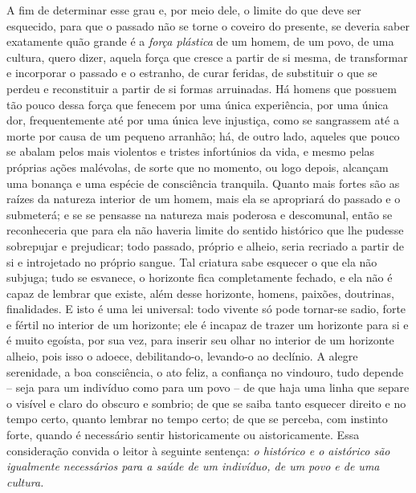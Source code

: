 A fim de determinar esse grau e, por meio dele, o limite do que
deve ser esquecido, para que o passado não se torne o coveiro do
presente, se deveria saber exatamente quão grande é a \emph{força
plástica} de um homem, de um povo, de uma cultura, quero dizer, aquela
força que cresce a partir de si mesma, de transformar e incorporar o
passado e o estranho, de curar feridas, de substituir o que se perdeu e
reconstituir a partir de si formas arruinadas. Há homens que possuem tão
pouco dessa força que fenecem por uma única experiência, por uma única
dor, frequentemente até por uma única leve injustiça, como se sangrassem
até a morte por causa de um pequeno arranhão; há, de outro lado, aqueles
que pouco se abalam pelos mais violentos e tristes infortúnios da vida,
e mesmo pelas próprias ações malévolas, de sorte que no momento, ou logo
depois, alcançam uma bonança e uma espécie de consciência tranquila.
Quanto mais fortes são as raízes da natureza interior de um homem, mais
ela se apropriará do passado e o submeterá; e se se pensasse na natureza
mais poderosa e descomunal, então se reconheceria que para ela não
haveria limite do sentido histórico que lhe pudesse sobrepujar e
prejudicar; todo passado, próprio e alheio, seria recriado a partir de
si e introjetado no próprio sangue. Tal criatura sabe esquecer o que ela
não subjuga; tudo se esvanece, o horizonte fica completamente fechado, e
ela não é capaz de lembrar que existe, além desse horizonte, homens,
paixões, doutrinas, finalidades. E isto é uma lei universal: todo
vivente só pode tornar-se sadio, forte e fértil no interior de um
horizonte; ele é incapaz de trazer um horizonte para si e é muito
egoísta, por sua vez, para inserir seu olhar no interior de um horizonte
alheio, pois isso o adoece, debilitando-o, levando-o ao declínio. A
alegre serenidade, a boa consciência, o ato feliz, a confiança no
vindouro, tudo depende -- seja para um indivíduo como para um povo -- de
que haja uma linha que separe o visível e claro do obscuro e sombrio; de
que se saiba tanto esquecer direito e no tempo certo, quanto lembrar no
tempo certo; de que se perceba, com instinto forte, quando é necessário
sentir historicamente ou aistoricamente. Essa consideração convida o
leitor à seguinte sentença: \emph{o histórico e o aistórico são
igualmente necessários para a saúde de um indivíduo, de um povo e de uma
cultura.}

